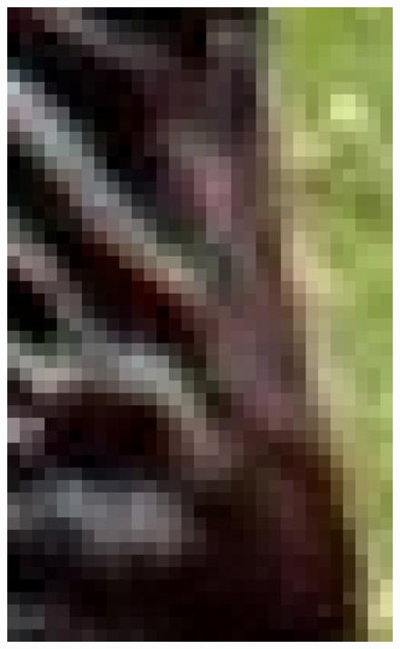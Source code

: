 \documentclass[review,numbers,sort&compress]{elsarticle}  %
\begin{document}
\begin{figure}[t]
{\begin{minipage}[b]{0.12\textwidth}
                \includegraphics[width=1\textwidth]{compareImage/OUR_zebra_mag_2.png}
            \end{minipage}
        }
\end{figure}
\end{document}
